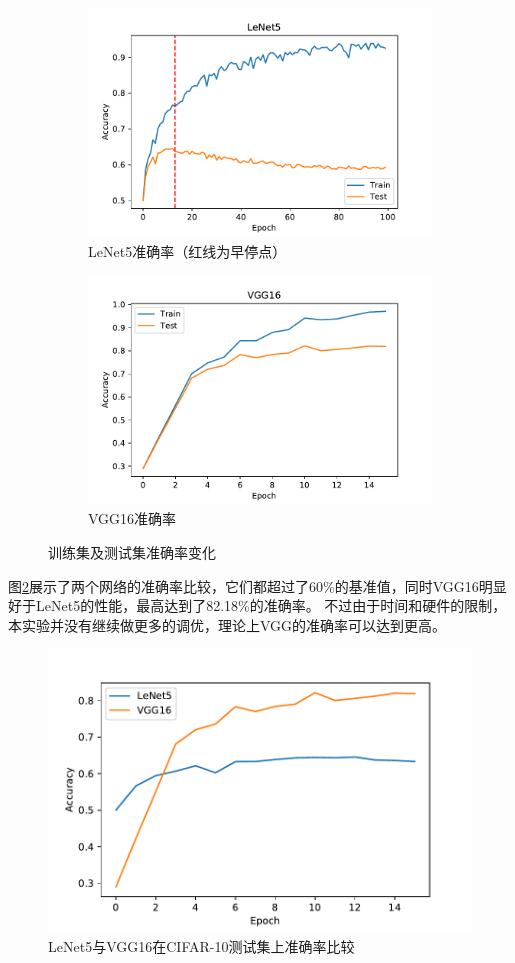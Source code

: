 \documentclass[logo,reportComp]{thesis}
\begin{document}
\begin{figure}[H]
\begin{subfigure}{0.5\textwidth}
\centering
\includegraphics[width=\linewidth]{fig/LeNet5_acc.pdf}
\caption{LeNet5准确率（红线为早停点）}
\end{subfigure}
\begin{subfigure}{0.5\textwidth}
\centering
\includegraphics[width=\linewidth]{fig/VGG16_acc.pdf}
\caption{VGG16准确率}
\end{subfigure}
\caption{训练集及测试集准确率变化}
\label{fig:acc}
\end{figure}

图\ref{fig:comparison}展示了两个网络的准确率比较，它们都超过了60\%的基准值，同时VGG16明显好于LeNet5的性能，最高达到了82.18\%的准确率。
不过由于时间和硬件的限制，本实验并没有继续做更多的调优，理论上VGG的准确率可以达到更高。
\begin{figure}[H]
\centering
\includegraphics[width=0.6\linewidth]{fig/acc_comparison.pdf}
\caption{LeNet5与VGG16在CIFAR-10测试集上准确率比较}
\label{fig:comparison}
\end{figure}
\end{document}
